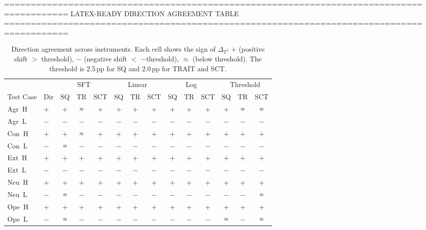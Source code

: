 
==========================================================================================
LATEX-READY DIRECTION AGREEMENT TABLE
==========================================================================================


\begin{table}[t]
\centering
\caption{Direction agreement across instruments. Each cell shows the sign of $\Delta_T$: 
$+$ (positive shift $>$ threshold), $-$ (negative shift $<$ $-$threshold), $\approx$ (below threshold).
The threshold is 2.5\,pp for SQ and 2.0\,pp for TRAIT and SCT.}
\label{tab:direction_agreement}
\small
\begin{tabular}{ll|ccc|ccc|ccc|ccc}
\toprule
& & \multicolumn{3}{c|}{SFT} & \multicolumn{3}{c|}{Linear} & \multicolumn{3}{c|}{Log} & \multicolumn{3}{c}{Threshold} \\
Test Case & Dir & SQ & TR & SCT & SQ & TR & SCT & SQ & TR & SCT & SQ & TR & SCT \\
\midrule
Agr~H & + & + & ≈ & + & + & + & + & + & + & + & + & ≈ & ≈ \\
Agr~L & − & − & − & − & − & − & − & − & − & − & − & − & − \\
Con~H & + & + & ≈ & + & + & + & + & + & + & + & + & + & + \\
Con~L & − & ≈ & − & − & − & − & − & − & − & − & − & − & − \\
Ext~H & + & + & + & + & + & + & + & + & + & + & + & + & + \\
Ext~L & − & − & − & − & − & − & − & − & − & − & − & − & − \\
Neu~H & + & + & + & + & + & + & + & + & + & + & + & + & + \\
Neu~L & − & ≈ & − & − & − & − & − & − & − & − & − & − & ≈ \\
Ope~H & + & + & + & + & + & + & + & + & + & + & + & + & + \\
Ope~L & − & ≈ & − & − & − & − & − & − & − & − & ≈ & − & ≈ \\
\bottomrule
\end{tabular}
\end{table}
